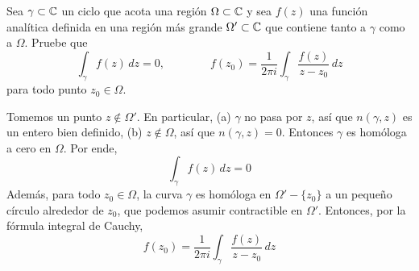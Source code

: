 \begin{exercise}
Sea $\gamma \subset \mathbb C$ un ciclo que acota una región $\Omega \subset \mathbb C$ y sea $f(z)$ una función analítica definida en una región más grande $\Omega' \subset \mathbb C$ que contiene tanto a $\gamma$ como a $\Omega$. Pruebe que
$$
\int_\gamma f(z) \, dz = 0, \qquad \qquad
f(z_0) = \frac 1 {2\pi i} \int_\gamma \frac {f(z)} {z - z_0} \, dz
$$
para todo punto $z_0 \in \Omega$.
\end{exercise}

\begin{solution}
Tomemos un punto $z \notin \Omega'$. En particular, (a) $\gamma$ no pasa por $z$, así que $n(\gamma, z)$ es un entero bien definido, (b) $z \notin \Omega$, así que $n(\gamma, z) = 0$. Entonces $\gamma$ es homóloga a cero en $\Omega$. Por ende,
$$\int_\gamma f(z) \, dz = 0$$
Además, para todo $z_0 \in \Omega$, la curva $\gamma$ es homóloga en $\Omega' - \{ z_0 \}$ a un pequeño círculo alrededor de $z_0$, que podemos asumir contractible en $\Omega'$. Entonces, por la fórmula integral de Cauchy,
$$f(z_0) = \frac 1 {2\pi i} \int_\gamma \frac {f(z)} {z - z_0} \, dz$$
\end{solution}
